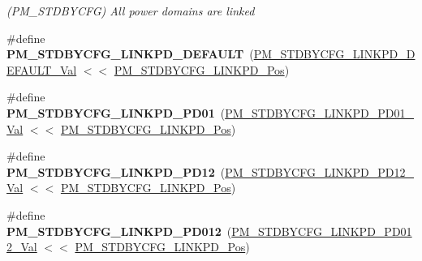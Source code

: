 \begin{DoxyCompactItemize}
\begin{DoxyCompactList}\small\item\em (P\+M\+\_\+\+S\+T\+D\+B\+Y\+C\+F\+G) All power domains are linked \end{DoxyCompactList}\item 
\hypertarget{group___s_a_m_l21___p_m_ga2fa269ce5805bc595df088f9175526ba}{}\#define {\bfseries P\+M\+\_\+\+S\+T\+D\+B\+Y\+C\+F\+G\+\_\+\+L\+I\+N\+K\+P\+D\+\_\+\+D\+E\+F\+A\+U\+L\+T}~(\hyperlink{group___s_a_m_l21___p_m_gabcd3ab08b953984c7484070dbb7f7f90}{P\+M\+\_\+\+S\+T\+D\+B\+Y\+C\+F\+G\+\_\+\+L\+I\+N\+K\+P\+D\+\_\+\+D\+E\+F\+A\+U\+L\+T\+\_\+\+Val} $<$$<$ \hyperlink{group___s_a_m_l21___p_m_ga08472f29227e219ca4aad41678bc52b1}{P\+M\+\_\+\+S\+T\+D\+B\+Y\+C\+F\+G\+\_\+\+L\+I\+N\+K\+P\+D\+\_\+\+Pos})\label{group___s_a_m_l21___p_m_ga2fa269ce5805bc595df088f9175526ba}

\item 
\hypertarget{group___s_a_m_l21___p_m_ga2ec9817d2e70c6bf796ff3bd804bf7a2}{}\#define {\bfseries P\+M\+\_\+\+S\+T\+D\+B\+Y\+C\+F\+G\+\_\+\+L\+I\+N\+K\+P\+D\+\_\+\+P\+D01}~(\hyperlink{group___s_a_m_l21___p_m_ga7f572694931cb3df5b6c6bb814a3fb10}{P\+M\+\_\+\+S\+T\+D\+B\+Y\+C\+F\+G\+\_\+\+L\+I\+N\+K\+P\+D\+\_\+\+P\+D01\+\_\+\+Val}   $<$$<$ \hyperlink{group___s_a_m_l21___p_m_ga08472f29227e219ca4aad41678bc52b1}{P\+M\+\_\+\+S\+T\+D\+B\+Y\+C\+F\+G\+\_\+\+L\+I\+N\+K\+P\+D\+\_\+\+Pos})\label{group___s_a_m_l21___p_m_ga2ec9817d2e70c6bf796ff3bd804bf7a2}

\item 
\hypertarget{group___s_a_m_l21___p_m_ga17518ac794ab75126dba2891dcdd406c}{}\#define {\bfseries P\+M\+\_\+\+S\+T\+D\+B\+Y\+C\+F\+G\+\_\+\+L\+I\+N\+K\+P\+D\+\_\+\+P\+D12}~(\hyperlink{group___s_a_m_l21___p_m_ga8a2ce283c39f41958f69265f6d3d8aa0}{P\+M\+\_\+\+S\+T\+D\+B\+Y\+C\+F\+G\+\_\+\+L\+I\+N\+K\+P\+D\+\_\+\+P\+D12\+\_\+\+Val}   $<$$<$ \hyperlink{group___s_a_m_l21___p_m_ga08472f29227e219ca4aad41678bc52b1}{P\+M\+\_\+\+S\+T\+D\+B\+Y\+C\+F\+G\+\_\+\+L\+I\+N\+K\+P\+D\+\_\+\+Pos})\label{group___s_a_m_l21___p_m_ga17518ac794ab75126dba2891dcdd406c}

\item 
\hypertarget{group___s_a_m_l21___p_m_ga4df50e819810b00e9544e52ca7e885c0}{}\#define {\bfseries P\+M\+\_\+\+S\+T\+D\+B\+Y\+C\+F\+G\+\_\+\+L\+I\+N\+K\+P\+D\+\_\+\+P\+D012}~(\hyperlink{group___s_a_m_l21___p_m_ga48339ccac33fea85f5c1d254d7d370c7}{P\+M\+\_\+\+S\+T\+D\+B\+Y\+C\+F\+G\+\_\+\+L\+I\+N\+K\+P\+D\+\_\+\+P\+D012\+\_\+\+Val}  $<$$<$ \hyperlink{group___s_a_m_l21___p_m_ga08472f29227e219ca4aad41678bc52b1}{P\+M\+\_\+\+S\+T\+D\+B\+Y\+C\+F\+G\+\_\+\+L\+I\+N\+K\+P\+D\+\_\+\+Pos})\label{group___s_a_m_l21___p_m_ga4df50e819810b00e9544e52ca7e885c0}


\end{DoxyCompactItemize}
